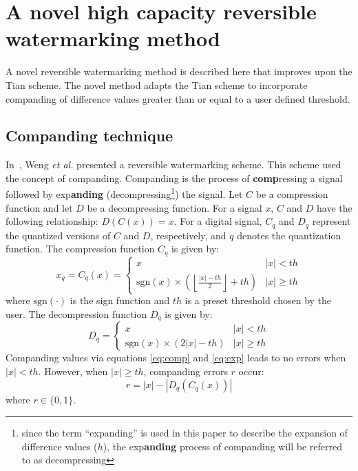 \documentclass[10pt,twocolumn,letterpaper]{article}
\begin{document}
{\section{A novel high capacity reversible watermarking method}
\label{sec:novel}
A novel reversible watermarking method is described here that improves upon the Tian scheme. 
The novel method adapts the Tian scheme to incorporate companding
of difference values greater than or equal to a user defined threshold.

\subsection{Companding technique}
\label{sec:compand}
In~\cite{weng07}, Weng \emph{et al.} presented a reversible watermarking scheme. This scheme used the concept of 
companding. 
Companding is the process of {\bf comp}ressing a signal followed by exp{\bf anding} (decompressing\footnote{since 
the term ``expanding'' is used in this paper to describe the expansion of difference values ($h$), the exp{\bf anding} process
of companding will be referred to as decompressing}) the signal. 
Let $C$ be a compression function and let $D$ be a decompressing function. For a signal $x$, $C$ and $D$ have the following 
relationship: $D(C(x)) = x$. For a digital signal, $C_{q}$ and $D_{q}$ represent the quantized versions of $C$ and $D$, 
respectively, and $q$ denotes the quantization function. The compression function $C_{q}$ is given by:
\begin{equation}
\label{eq:comp}
 x_{q} = C_{q}(x) = \left \{ 	\begin{array}{ll}
				x & |x| < th \\
				\mbox{sgn}(x) \times \left( \left \lfloor \frac{|x| - th}{2} \right \rfloor + th \right) & |x| \geq th 
				\end{array}
			\right.
\end{equation}
where $\mbox{sgn}(\cdot)$ is the sign function and $th$ is a preset threshold chosen by the user.
The decompression function $D_{q}$ is given by:
\begin{equation}
\label{eq:exp}
D_{q} = \left \{	\begin{array}{ll}
			x & |x| < th \\
			\mbox{sgn}(x) \times (2|x| - th) & |x| \geq th
			\end{array}
	\right.
\end{equation}
Companding values via equations \ref{eq:comp} and \ref{eq:exp} leads to no errors when 
$|x| < th$. However, when $|x| \geq th$, companding errors $r$ occur:
\begin{equation}
\label{eq:error}
r = |x| - |D_{q}(C_{q}(x))|
\end{equation}
where $r \in \{0,1\}$. 



}
\end{document}
